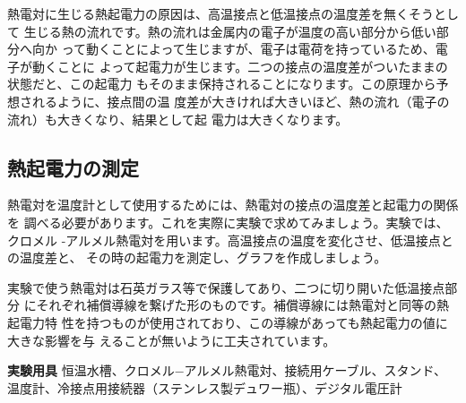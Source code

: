 熱電対に生じる熱起電力の原因は、高温接点と低温接点の温度差を無くそうとして 
生じる熱の流れです。熱の流れは金属内の電子が温度の高い部分から低い部分へ向か 
って動くことによって生じますが、電子は電荷を持っているため、電子が動くことに 
よって起電力が生じます。二つの接点の温度差がついたままの状態だと、この起電力 
もそのまま保持されることになります。この原理から予想されるように、接点間の温
度差が大きければ大きいほど、熱の流れ（電子の流れ）も大きくなり、結果として起 
電力は大きくなります。


\subsection{熱起電力の測定}

熱電対を温度計として使用するためには、熱電対の接点の温度差と起電力の関係を 
調べる必要があります。これを実際に実験で求めてみましょう。実験では、クロメル 
-アルメル熱電対を用います。高温接点の温度を変化させ、低温接点との温度差と、 
その時の起電力を測定し、グラフを作成しましょう。

実験で使う熱電対は石英ガラス等で保護してあり、二つに切り開いた低温接点部分 
にそれぞれ補償導線を繋げた形のものです。補償導線には熱電対と同等の熱起電力特 
性を持つものが使用されており、この導線があっても熱起電力の値に大きな影響を与 
えることが無いように工夫されています。

\newpage

\jikken

\begin{itemsquarebox}[c]{\bf 実験用具}
恒温水槽、クロメル−アルメル熱電対、接続用ケーブル、スタンド、
温度計、冷接点用接続器（ステンレス製デュワー瓶）、デジタル電圧計
\end{itemsquarebox}

\bigskip


